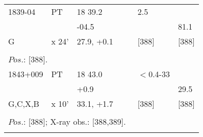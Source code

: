 \documentclass{aa}
\begin{document}
\begin{table*}[h]
\begin{tabular}{p{2.5cm}p{1cm}p{1.8cm}p{2.3cm}p{3.3cm}p{2.0cm}p{2.2cm}}
\noalign{\smallskip}
\hline
\noalign{\smallskip}
 1839-04      & PT       & 18 39.2        &                    &                      & 2.5               &                        \\
                      &           & -04.5           &                    &                     &                           &    81.1  \\
G             & x 24'          & 27.9, +0.1  &                     &                      & [388]        &  [388]    \\
\\
\multicolumn{7}{p{17.5cm}}{
$Pos$.: [388]. }\\

\noalign{\smallskip}
\hline
\noalign{\smallskip}
 1843+009     & PT             & 18 43.0        &                    &                      & $<$0.4-33        &              \\
                        &                    & +0.9             &                    &                      &                           &   29.5   \\
G,C,X,B         & x 10'          & 33.1, +1.7    &                    &                      & [388]                 &  [388]    \\
\\
\multicolumn{7}{p{17.5cm}}{
$Pos$.: [388]; X-ray obs.: [388,389].}\\

\noalign{\smallskip}
\hline
\end{tabular}
\end{table*}
\end{document}
